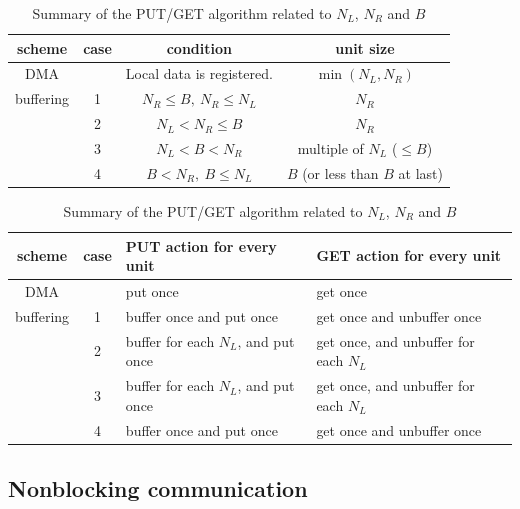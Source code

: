 \begin{table}[tbh]
 \caption{Summary of the PUT/GET algorithm related to $N_L$, $N_R$ and $B$}
 \label{tab:putget}
 \begin{flushleft}
  \begin{tabular}{|@{~}c@{~}|c||@{~}c@{~}|@{~}c@{~}|}
\hline
scheme &
case &
condition &
unit size \\
\hline
\hline
DMA &
&
Local data is registered. &
$\min(N_L, N_R)$ \\
\hline
buffering &
1 & 
$N_R \leq B,~ N_R \leq N_L$ &
$N_R$ \\
\cline{2-4}
&
2 &
$N_L < N_R \leq B$ &
$N_R$ \\
\cline{2-4}
&
3 &
$N_L < B < N_R$ &
multiple of $N_L$ ($\leq B$) \\
\cline{2-4}
&
4 &
$B < N_R,~ B \leq N_L$ &
$B$ (or less than $B$ at last) \\
\hline
  \end{tabular}
 \end{flushleft}
 \begin{flushleft}
  \begin{tabular}{|@{~}c@{~}|c||@{~~}l@{~~}|@{~~}l@{~~}|}
\hline
scheme &
case &
PUT action for every unit &
GET action for every unit \\
\hline
\hline
DMA &
&
put once &
get once \\
\hline
buffering &
1 &
buffer once and put once &
get once and unbuffer once \\
\cline{2-4}
&
2 &
buffer for each $N_L$, and put once &
get once, and unbuffer for each $N_L$ \\
\cline{2-4}
&
3 &
buffer for each $N_L$, and put once &
get once, and unbuffer for each $N_L$ \\
\cline{2-4}
&
4 &
buffer once and put once &
get once and unbuffer once \\
\hline
  \end{tabular}
 \end{flushleft}
\end{table}



\subsection{Nonblocking communication}





